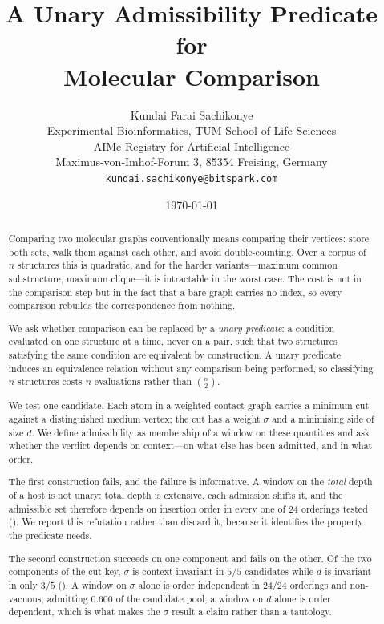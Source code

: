 \documentclass[11pt,twocolumn,a4paper]{article}
\title{\textbf{A Unary Admissibility Predicate for\\Molecular
Comparison}}
\author{%
Kundai Farai Sachikonye\\[0.3em]
\normalsize Experimental Bioinformatics, TUM School of Life Sciences\\
\normalsize AIMe Registry for Artificial Intelligence \\
\normalsize Maximus-von-Imhof-Forum 3, 85354 Freising, Germany\\
\normalsize \texttt{kundai.sachikonye@bitspark.com}}
\date{\today}
\theoremstyle{upthm}
\theoremstyle{definition}
\theoremstyle{remark}
\newcommand{\sep}{\sigma}
\newcommand{\dep}{d}
\begin{document}
\maketitle

\tableofcontents

\begin{abstract}
\noindent
Comparing two molecular graphs conventionally means comparing their
vertices: store both sets, walk them against each other, and avoid
double-counting. Over a corpus of $n$ structures this is quadratic, and
for the harder variants---maximum common substructure, maximum
clique---it is intractable in the worst case. The cost is not in the
comparison step but in the fact that a bare graph carries no index, so
every comparison rebuilds the correspondence from nothing.

We ask whether comparison can be replaced by a \emph{unary predicate}: a
condition evaluated on one structure at a time, never on a pair, such
that two structures satisfying the same condition are equivalent by
construction. A unary predicate induces an equivalence relation without
any comparison being performed, so classifying $n$ structures costs $n$
evaluations rather than $\binom{n}{2}$.

We test one candidate. Each atom in a weighted contact graph carries a
minimum cut against a distinguished medium vertex; the cut has a weight
$\sep$ and a minimising side of size $\dep$. We define admissibility as
membership of a window on these quantities and ask whether the verdict
depends on context---on what else has been admitted, and in what order.

The first construction fails, and the failure is informative. A window on
the \emph{total} depth of a host is not unary: total depth is extensive,
each admission shifts it, and the admissible set therefore depends on
insertion order in every one of $24$ orderings tested
(). We report this refutation rather than
discard it, because it identifies the property the predicate needs.

The second construction succeeds on one component and fails on the other.
Of the two components of the cut key, $\sep$ is context-invariant in
$5/5$ candidates while $\dep$ is invariant in only $3/5$
(). A window on $\sep$ alone is order
independent in $24/24$ orderings and non-vacuous, admitting $0.600$ of
the candidate pool; a window on $\dep$ alone is order dependent, which is
what makes the $\sep$ result a claim rather than a tautology.


\end{abstract}
\end{document}
